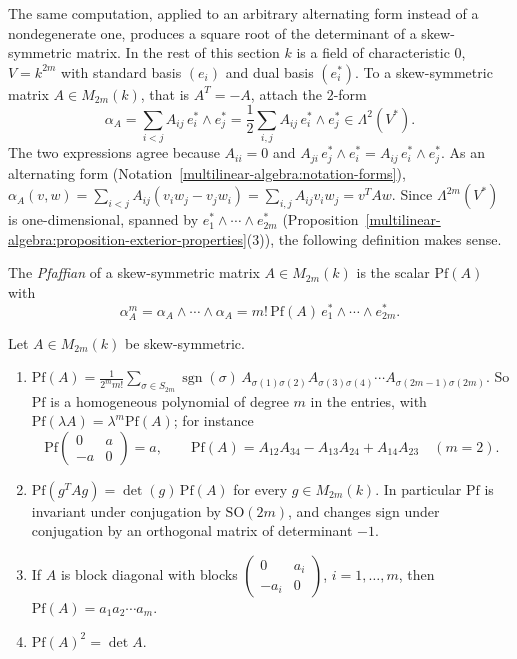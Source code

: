 The same computation, applied to an arbitrary alternating form instead of a nondegenerate one, produces a square root of the determinant of a skew-symmetric matrix. In the rest
of this section $k$ is a field of characteristic $0$, $V = k^{2m}$ with standard basis $(e_i)$ and dual basis $(e_i^*)$. To a skew-symmetric matrix $A \in M_{2m}(k)$, that
is $A^T = -A$, attach the $2$-form
\[
\alpha_A = \sum_{i < j}A_{ij}\,e_i^* \wedge e_j^* = \frac12\sum_{i, j}A_{ij}\,e_i^* \wedge e_j^* \in \Lambda^2(V^*) .
\]
The two expressions agree because $A_{ii} = 0$ and $A_{ji}\,e_j^* \wedge e_i^* = A_{ij}\,e_i^* \wedge e_j^*$. As an alternating form (Notation~\ref{multilinear-algebra:notation-forms}),
$\alpha_A(v, w) = \sum_{i < j}A_{ij}(v_iw_j - v_jw_i) = \sum_{i, j}A_{ij}v_iw_j = v^TAw$. Since $\Lambda^{2m}(V^*)$ is one-dimensional, spanned by $e_1^* \wedge \cdots \wedge e_{2m}^*$
(Proposition~\ref{multilinear-algebra:proposition-exterior-properties}(3)), the following definition makes sense.

\begin{definition}\label{multilinear-algebra:definition-pfaffian}
The \emph{Pfaffian} of a skew-symmetric matrix $A \in M_{2m}(k)$ is the scalar $\mathrm{Pf}(A)$ with
\[
\alpha_A^m = \alpha_A \wedge \cdots \wedge \alpha_A = m!\,\mathrm{Pf}(A)\,e_1^* \wedge \cdots \wedge e_{2m}^* .
\]
\end{definition}

\begin{proposition}\label{multilinear-algebra:proposition-pfaffian}
Let $A \in M_{2m}(k)$ be skew-symmetric.
\begin{enumerate}
\item $\displaystyle\mathrm{Pf}(A) = \frac{1}{2^mm!}\sum_{\sigma \in S_{2m}}\operatorname{sgn}(\sigma)\,A_{\sigma(1)\sigma(2)}A_{\sigma(3)\sigma(4)} \cdots A_{\sigma(2m-1)\sigma(2m)}$. So $\mathrm{Pf}$ is a
homogeneous polynomial of degree $m$ in the entries, with $\mathrm{Pf}(\lambda A) = \lambda^m\mathrm{Pf}(A)$; for instance
\[
\mathrm{Pf}\begin{pmatrix} 0 & a\\ -a & 0\end{pmatrix} = a, \qquad \mathrm{Pf}(A) = A_{12}A_{34} - A_{13}A_{24} + A_{14}A_{23} \quad (m = 2).
\]
\item $\mathrm{Pf}(g^TAg) = \det(g)\,\mathrm{Pf}(A)$ for every $g \in M_{2m}(k)$. In particular $\mathrm{Pf}$ is invariant under conjugation by $\mathrm{SO}(2m)$, and changes sign under
conjugation by an orthogonal matrix of determinant $-1$.
\item If $A$ is block diagonal with blocks $\begin{pmatrix} 0 & a_i\\ -a_i & 0\end{pmatrix}$, $i = 1, \ldots, m$, then $\mathrm{Pf}(A) = a_1a_2 \cdots a_m$.
\item $\mathrm{Pf}(A)^2 = \det A$.
\end{enumerate}
\end{proposition}

